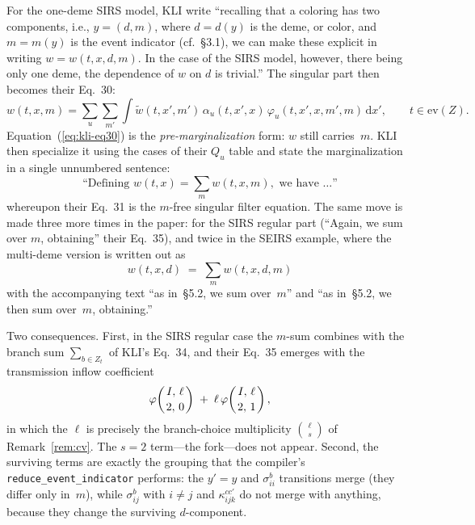 \documentclass[11pt,leqno]{article}
\newcommand{\dd}[1]{\,\mathrm{d}{#1}}
\newcommand{\binratio}[4]{\varphi\!\left(\genfrac{}{}{0pt}{}{#1,\,#2}{#3,\,#4}\right)}
\newcommand{\code}[1]{\texttt{#1}}
\theoremstyle{plain}
\theoremstyle{definition}
\begin{document}
For the one-deme SIRS model, KLI write ``recalling that a coloring has
two components, i.e., $y = (d,m)$, where $d = d(y)$ is the deme, or
color, and $m = m(y)$ is the event indicator (cf.~\S3.1), we can make
these explicit in writing $w = w(t,x,d,m)$.  In the case of the SIRS
model, however, there being only one deme, the dependence of $w$ on
$d$ is trivial.''  The singular part then becomes their Eq.~30:
\begin{equation}\label{eq:kli-eq30}
  w(t,x,m) = \sum_u \sum_{m'} \int
    \tilde{w}(t,x',m')\, \alpha_u(t,x',x)\,
    \varphi_u(t,x',x,m',m) \dd{x'},
  \qquad t \in \mathrm{ev}(Z).
\end{equation}
Equation~(\ref{eq:kli-eq30}) is the \emph{pre-marginalization} form:
$w$ still carries~$m$.  KLI then specialize it using the cases of
their $Q_u$ table and state the marginalization in a single unnumbered
sentence:
\begin{equation}\label{eq:m-sum}
  \text{``Defining } w(t,x) = \sum_m w(t,x,m),
  \text{ we have \ldots''}
\end{equation}
whereupon their Eq.~31 is the $m$-free singular filter equation.  The
same move is made three more times in the paper: for the SIRS regular
part (``Again, we sum over $m$, obtaining'' their Eq.~35), and twice in
the SEIRS example, where the multi-deme version is written out as
\[
  w(t,x,d) \;=\; \sum_m w(t,x,d,m)
\]
with the accompanying text ``as in~\S5.2, we sum over~$m$'' and ``as
in~\S5.2, we then sum over~$m$, obtaining.''

Two consequences.  First, in the SIRS regular case the $m$-sum
combines with the branch sum $\sum_{b \in Z_t}$ of KLI's Eq.~34, and
their Eq.~35 emerges with the transmission inflow coefficient
\[
  \binratio{I}{\ell}{2}{0} \;+\; \ell\,\binratio{I}{\ell}{2}{1},
\]
in which the $\ell$ is precisely the branch-choice multiplicity
$\binom{\ell}{s}$ of Remark~\ref{rem:cv}.  The $s = 2$ term---the
fork---does not appear.  Second, the surviving terms are exactly the
grouping that the compiler's \code{reduce\_event\_indicator} performs:
the $y' = y$ and $\sigma^{b}_{ii}$ transitions merge (they differ only
in~$m$), while $\sigma^{b}_{ij}$ with $i \ne j$ and
$\kappa^{cc'}_{ijk}$ do not merge with anything, because they change
the surviving $d$-component.
\end{document}
